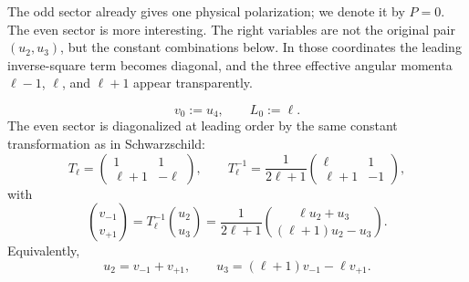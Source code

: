\documentclass[12pt]{article}
\numberwithin{equation}{section}
\theoremstyle{plain}
\theoremstyle{definition}
\theoremstyle{remark}
\begin{document}
The odd sector already gives one physical polarization; we denote it by $P=0$.  The even sector is more interesting.  The right variables are not the original pair $(u_2,u_3)$, but the constant combinations below.  In those coordinates the leading inverse-square term becomes diagonal, and the three effective angular momenta $\ell-1$, $\ell$, and $\ell+1$ appear transparently.

\begin{equation}\label{eq:odd_pol}
   v_0:=u_4,
   \qquad
   L_0:=\ell.
\end{equation}
The even sector is diagonalized at leading order by the same constant transformation as in Schwarzschild:
\begin{equation}\label{eq:T_matrix}
   T_\ell=
   \begin{pmatrix}
      1&1\\
      \ell+1&-\ell
   \end{pmatrix},
   \qquad
   T_\ell^{-1}
   =
   \frac{1}{2\ell+1}
   \begin{pmatrix}
      \ell&1\\
      \ell+1&-1
   \end{pmatrix},
\end{equation}
with
\begin{equation}\label{eq:polarization_variables}
   \binom{v_{-1}}{v_{+1}}
   =
   T_\ell^{-1}\binom{u_2}{u_3}
   =
   \frac{1}{2\ell+1}
   \binom{\ell u_2+u_3}{(\ell+1)u_2-u_3}.
\end{equation}
Equivalently,
\begin{equation}\label{eq:inverse_polarization_variables}
   u_2=v_{-1}+v_{+1},
   \qquad
   u_3=(\ell+1)v_{-1}-\ell v_{+1}.
\end{equation}
\end{document}
